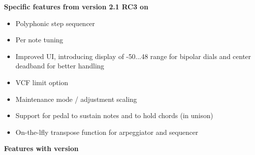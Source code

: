 \documentclass[landscape, 11pt, oneside]{report}
\newenvironment{flowtext}{\addmargin[0cm]{7cm}}{\endaddmargin} %
\begin{document}
\begin{flowtext}
\textbf{Specific features from version 2.1 RC3 on}
  
\begin{itemize}
  \setlength\itemsep{0cm}
  \item Polyphonic step sequencer
  \item Per note tuning
  \item Improved UI, introducing display of -50...48 range for bipolar dials and center deadband for better handling  
  \item VCF limit option
  \item Maintenance mode / adjustment scaling
  \item Support for pedal to sustain notes and to hold chords (in unison)
  \item On-the-lfly transpose function for arpeggiator and sequencer
\end{itemize}

\textbf{Features with version \version}
  

\end{flowtext}
\end{document}
